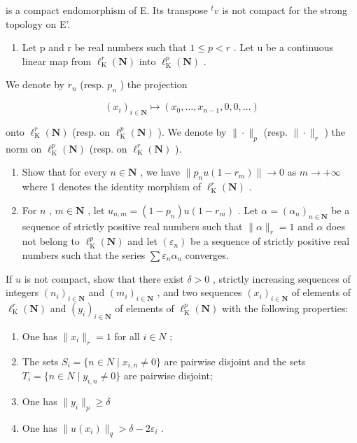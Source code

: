 is a compact endomorphism of E. Its transpose \(^{t}v\) is not compact for the strong topology on E'.

\begin{enumerate}
\def\labelenumi{\arabic{enumi})}
\setcounter{enumi}{9}
\tightlist
\item
  Let p and r be real numbers such that \(1 \leqslant p < r\) . Let u be a continuous linear map from \(\ell_{\mathrm{K}}^{r}(\mathbf{N})\) into \(\ell_{\mathrm{K}}^{p}(\mathbf{N})\) .
\end{enumerate}

We denote by \(r_{n}\) (resp. \(p_{n}\) ) the projection

\[
(x _ {i}) _ {i \in \mathbf {N}} \mapsto (x _ {0}, \ldots , x _ {n - 1}, 0, 0, \ldots)
\]

onto \(\ell_{\mathrm{K}}^{r}(\mathbf{N})\) (resp. on \(\ell_{\mathrm{K}}^{p}(\mathbf{N})\) ). We denote by \(\| \cdot \| _p\) (resp. \(\| \cdot \| _r\) ) the norm on \(\ell_{\mathrm{K}}^{p}(\mathbf{N})\) (resp. on \(\ell_{\mathrm{K}}^{r}(\mathbf{N})\) ).

\begin{enumerate}
\def\labelenumi{\alph{enumi})}
\item
  Show that for every \(n \in \mathbf{N}\) , we have \(\|p_n u(1 - r_m)\| \to 0\) as \(m \to +\infty\) where 1 denotes the identity morphism of \(\ell_{\mathrm{K}}^{r}(\mathbf{N})\) .
\item
  For \(n\) , \(m \in \mathbf{N}\) , let \(u_{n,m} = (1 - p_n)u(1 - r_m)\) . Let \(\alpha = (\alpha_n)_{n \in \mathbf{N}}\) be a sequence of strictly positive real numbers such that \(\|\alpha\|_r = 1\) and \(\alpha\) does not belong to \(\ell_{\mathrm{K}}^p(\mathbf{N})\) and let \((\varepsilon_n)\) be a sequence of strictly positive real numbers such that the series \(\sum \varepsilon_n\alpha_n\) converges.
\end{enumerate}

If \(u\) is not compact, show that there exist \(\delta > 0\) , strictly increasing sequences of integers \((n_i)_{i \in \mathbf{N}}\) and \((m_i)_{i \in \mathbf{N}}\) , and two sequences \((x_i)_{i \in \mathbf{N}}\) of elements of \(\ell_{\mathrm{K}}^r(\mathbf{N})\) and \((y_i)_{i \in \mathbf{N}}\) of elements of \(\ell_{\mathrm{K}}^p(\mathbf{N})\) with the following properties:

\begin{enumerate}
\def\labelenumi{(\roman{enumi})}
\item
  One has \(\|x_{i}\|_{r}=1\) for all \(i\in N\) ;
\item
  The sets \(S_{i} = \{n \in N \mid x_{i,n} \neq 0\}\) are pairwise disjoint and the sets \(T_{i} = \{n \in N \mid y_{i,n} \neq 0\}\) are pairwise disjoint;
\item
  One has \(\| y_i\| _p\geqslant \delta\)
\item
  One has \(\|u(x_{i})\|_{q} > \delta - 2\varepsilon_{i}\) .
\end{enumerate}

